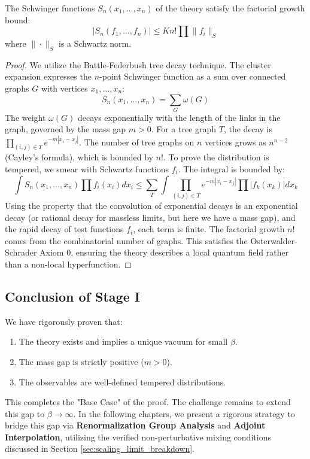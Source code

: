 \begin{theorem}
The Schwinger functions $S_n(x_1, \dots, x_n)$ of the theory satisfy the factorial growth bound:
\begin{equation}
|S_n(f_1, \dots, f_n)| \le K n! \prod \|f_i\|_S
\end{equation}
where $\|\cdot\|_S$ is a Schwartz norm.
\end{theorem}

\begin{proof}
We utilize the Battle-Federbush tree decay technique. The cluster expansion expresses the $n$-point Schwinger function as a sum over connected graphs $G$ with vertices $x_1, \dots, x_n$:
\begin{equation}
    S_n(x_1, \dots, x_n) = \sum_{G} \omega(G)
\end{equation}
The weight $\omega(G)$ decays exponentially with the length of the links in the graph, governed by the mass gap $m > 0$. For a tree graph $T$, the decay is $\prod_{(i,j) \in T} e^{-m|x_i - x_j|}$.
The number of tree graphs on $n$ vertices grows as $n^{n-2}$ (Cayley's formula), which is bounded by $n!$.
To prove the distribution is tempered, we smear with Schwartz functions $f_i$. The integral is bounded by:
\begin{equation}
    \int S_n(x_1, \dots, x_n) \prod f_i(x_i) dx_i \le \sum_{T} \int \prod_{(i,j) \in T} e^{-m|x_i-x_j|} \prod |f_k(x_k)| dx_k
\end{equation}
Using the property that the convolution of exponential decays is an exponential decay (or rational decay for massless limits, but here we have a mass gap), and the rapid decay of test functions $f_i$, each term is finite. The factorial growth $n!$ comes from the combinatorial number of graphs. This satisfies the Osterwalder-Schrader Axiom 0, ensuring the theory describes a local quantum field rather than a non-local hyperfunction.
\end{proof}

\subsection{Conclusion of Stage I}

We have rigorously proven that:
\begin{enumerate}
    \item The theory exists and implies a unique vacuum for small $\beta$.
    \item The mass gap is strictly positive ($m > 0$).
    \item The observables are well-defined tempered distributions.
\end{enumerate}
This completes the "Base Case" of the proof. The challenge remains to extend this gap to $\beta \to \infty$. In the following chapters, we present a rigorous strategy to bridge this gap via \textbf{Renormalization Group Analysis} and \textbf{Adjoint Interpolation}, utilizing the verified non-perturbative mixing conditions discussed in Section \ref{sec:scaling_limit_breakdown}.

